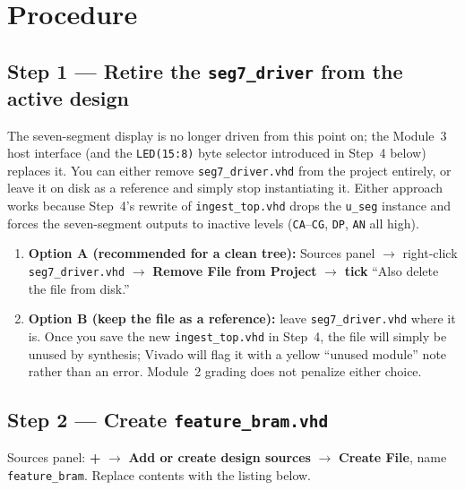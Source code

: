 \documentclass[11pt,letterpaper]{article}
\begin{document}
\section{Procedure}

\subsection{Step 1 --- Retire the \texttt{seg7\_driver} from the active design}

The seven-segment display is no longer driven from this point on; the Module~3 host interface (and the \texttt{LED(15:8)} byte selector introduced in Step~4 below) replaces it. You can either remove \texttt{seg7\_driver.vhd} from the project entirely, or leave it on disk as a reference and simply stop instantiating it. Either approach works because Step~4's rewrite of \texttt{ingest\_top.vhd} drops the \texttt{u\_seg} instance and forces the seven-segment outputs to inactive levels (\texttt{CA}--\texttt{CG}, \texttt{DP}, \texttt{AN} all high).

\begin{enumerate}[leftmargin=2em]
	\item \textbf{Option A (recommended for a clean tree):} Sources panel $\to$ right-click \texttt{seg7\_driver.vhd} $\to$ \textbf{Remove File from Project} $\to$ \textbf{tick} ``Also delete the file from disk.''
	\item \textbf{Option B (keep the file as a reference):} leave \texttt{seg7\_driver.vhd} where it is. Once you save the new \texttt{ingest\_top.vhd} in Step~4, the file will simply be unused by synthesis; Vivado will flag it with a yellow ``unused module'' note rather than an error. Module~2 grading does not penalize either choice.
\end{enumerate}

\subsection{Step 2 --- Create \texttt{feature\_bram.vhd}}

Sources panel: \textbf{+} $\to$ \textbf{Add or create design sources} $\to$ \textbf{Create File}, name \texttt{feature\_bram}. Replace contents with the listing below.
\end{document}
